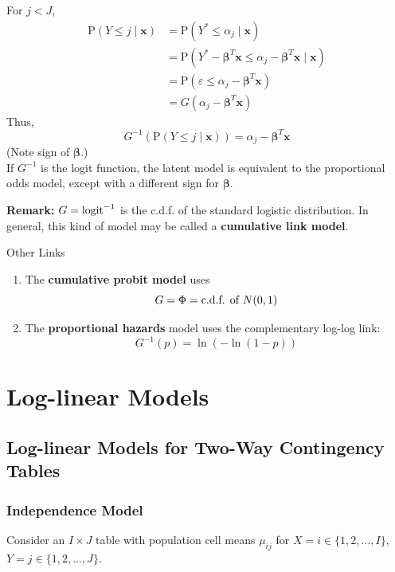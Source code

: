 \documentclass[11pt]{elegantbook}
\begin{document}
For $j<J$,
$$
\begin{aligned}
\mathrm{P}(Y \leq j \mid \boldsymbol{x}) & =\mathrm{P}\left(Y^* \leq \alpha_j \mid \boldsymbol{x}\right) \\
& =\mathrm{P}\left(Y^*-\boldsymbol{\beta}^T \boldsymbol{x} \leq \alpha_j-\boldsymbol{\beta}^T \boldsymbol{x} \mid \boldsymbol{x}\right) \\
& =\mathrm{P}\left(\varepsilon \leq \alpha_j-\boldsymbol{\beta}^T \boldsymbol{x}\right) \\
& =G\left(\alpha_j-\boldsymbol{\beta}^T \boldsymbol{x}\right)
\end{aligned}
$$
Thus,
$$
G^{-1}(\mathrm{P}(Y \leq j \mid \boldsymbol{x}))=\alpha_j-\boldsymbol{\beta}^T \boldsymbol{x}
$$
(Note sign of $\boldsymbol{\beta}$.)\\
If $G^{-1}$ is the logit function, the latent model is equivalent to the proportional odds model, except with a different sign for $\boldsymbol{\beta}$.

\textbf{Remark:} $G=\textnormal{logit}^{-1}$ is the c.d.f. of the standard logistic distribution. In general, this kind of model may be called a \textbf{cumulative link model}.

Other Links
\begin{enumerate}[$\bullet$]
    \item The \textbf{cumulative probit model} uses $$G=\Phi=\textnormal{c.d.f. of }N(0,1)$$
    \item The \textbf{proportional hazards} model uses the complementary log-log link:
    $$G^{-1}(p)=\ln(-\ln(1-p))$$
\end{enumerate}


\chapter{Log-linear Models}
\section{Log-linear Models for Two-Way Contingency Tables}

\subsection{Independence Model}
Consider an $I \times J$ table with population cell means $\mu_{ij}$ for $X=i\in\{1,2,...,I\}$, $Y=j\in\{1,2,...,J\}$.
\end{document}
